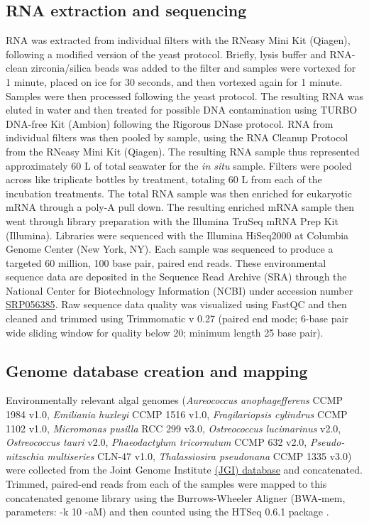 \subsection{RNA extraction and sequencing}
RNA was extracted from individual filters with the RNeasy Mini Kit (Qiagen), following a modified version of the yeast protocol. Briefly, lysis buffer and RNA-clean zirconia/silica beads was added to the filter and samples were vortexed for 1 minute, placed on ice for 30 seconds, and then vortexed again for 1 minute. Samples were then processed following the yeast protocol. The resulting RNA was eluted in water and then treated for possible DNA contamination using TURBO DNA-free Kit (Ambion) following the Rigorous DNase protocol. RNA from individual filters was then pooled by sample, using the RNA Cleanup Protocol from the RNeasy Mini Kit (Qiagen). The resulting RNA sample thus represented approximately 60 L of total seawater for the \textit{in situ} sample. Filters were pooled across like triplicate bottles by treatment, totaling 60 L from each of the incubation treatments. The total RNA sample was then enriched for eukaryotic mRNA through a poly-A pull down. The resulting enriched mRNA sample then went through library preparation with the Illumina TruSeq mRNA Prep Kit (Illumina). Libraries were sequenced with the Illumina HiSeq2000 at Columbia Genome Center (New York, NY). Each sample was sequenced to produce a targeted 60 million, 100 base pair, paired end reads. These environmental sequence data are deposited in the Sequence Read Archive (SRA) through the National Center for Biotechnology Information (NCBI) under accession number \href{http://google.com}{SRP056385}. Raw sequence data quality was visualized using FastQC and then cleaned and trimmed using Trimmomatic v 0.27 (paired end mode; 6-base pair wide sliding window for quality below 20; minimum length 25 base pair). \par
\subsection{Genome database creation and mapping}
Environmentally relevant algal genomes (\textit{Aureococcus anophagefferens} CCMP 1984 v1.0, \textit{Emiliania huxleyi} CCMP 1516 v1.0, \textit{Fragilariopsis cylindrus} CCMP 1102 v1.0, \textit{Micromonas pusilla} RCC 299 v3.0, \textit{Ostreococcus lucimarinus} v2.0, \textit{Ostreococcus tauri} v2.0, \textit{Phaeodactylum tricornutum} CCMP 632 v2.0, \textit{Pseudo-nitzschia multiseries} CLN-47 v1.0, \textit{Thalassiosira pseudonana} CCMP 1335 v3.0) were collected from the Joint Genome Institute \href{http://genome.jgi-psf.org/}{(JGI) database} and concatenated. Trimmed, paired-end reads from each of the samples were mapped to this concatenated genome library using the Burrows-Wheeler Aligner \citep{Li2010} (BWA-mem, parameters: -k 10 -aM) and then counted using the HTSeq 0.6.1 package \citep{Anders2014}.\par 
